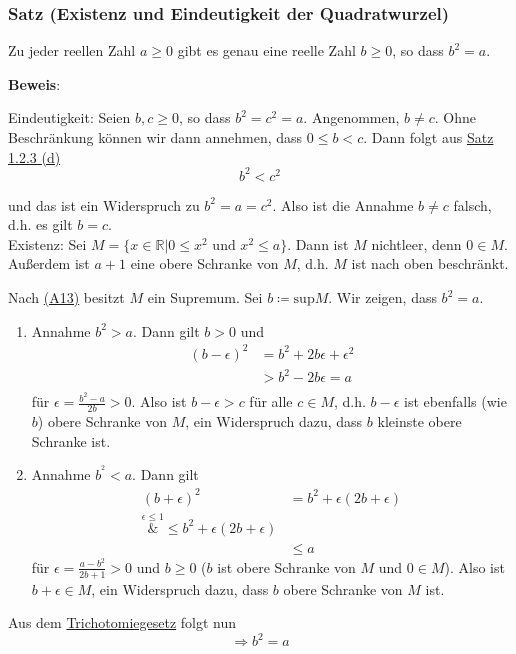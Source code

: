 \documentclass{article}
\begin{document}
\subsubsection{Satz (Existenz und Eindeutigkeit der Quadratwurzel)}

Zu jeder reellen Zahl $a \geq 0$ gibt es genau eine reelle Zahl $b \geq 0$, so dass $b^2 = a$.


\noindent
\textbf{Beweis}:

Eindeutigkeit: Seien $b, c \geq 0$, so dass $b^2 = c^2 = a$. Angenommen, $b \ne c$. Ohne Beschränkung können wir dann
annehmen, dass $0 \leq b < c$. Dann folgt aus \hyperref[sec:1.2.3_d]{Satz 1.2.3 (d)}
\[
  b^2 < c^2
\]

und das ist ein Widerspruch zu $b^2 = a = c^2$.
Also ist die Annahme $b \ne c$ falsch, d.h. es gilt  $b = c$. \\

Existenz: Sei $M = \{ x \in \mathbb{R} | 0 \leq x^2 \text{ und } x^2 \leq a \}$. Dann ist $M$ nichtleer,
denn $0 \in M$.
Außerdem ist $a + 1$ eine obere Schranke von $M$, d.h. $M$ ist nach oben beschränkt.

Nach \hyperref[axiom:13]{(A13)} besitzt $M$ ein Supremum. Sei $b \coloneqq \text{sup}M$.
Wir zeigen, dass $b^2 = a$.

\begin{enumerate}[1.]
\item Annahme $b^2 > a$. Dann gilt $b > 0$ und
  \begin{align*}
    (b - \epsilon)^2 &= b^2 + 2b\epsilon + \epsilon^2 \\
                     &> b^2 - 2b\epsilon = a\\
  \end{align*}
  für $\epsilon = \frac{b^2 - a}{2b} > 0$.
  Also ist $b - \epsilon > c$ für alle $c \in M$, d.h. $b - \epsilon$ ist ebenfalls (wie $b$) obere
  Schranke von $M$, ein Widerspruch dazu, dass $b$ kleinste obere Schranke ist.
\item Annahme $b^^2 < a$. Dann gilt
  \begin{align*}
    (b + \epsilon)^2 &= b^2 + \epsilon(2b + \epsilon) \\
    \overset{\epsilon \leq 1}&{\leq} b^2 + \epsilon(2b + \epsilon) \\
                     &\leq a
  \end{align*}
  für $\epsilon = \frac{a - b^2}{2b + 1} > 0$ und $b \geq 0$ ($b$ ist obere Schranke von $M$ und $0 \in M$).
  Also ist $b + \epsilon \in M$, ein Widerspruch dazu, dass $b$ obere Schranke von $M$ ist.
\end{enumerate}

Aus dem \hyperref[axiom:10]{Trichotomiegesetz} folgt nun
\[
  \Rightarrow b^2 = a
\]
\end{document}
